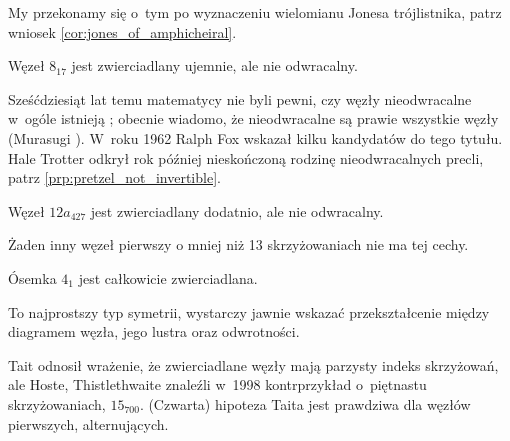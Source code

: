 My przekonamy się o~tym po wyznaczeniu wielomianu Jonesa trójlistnika, patrz wniosek \ref{cor:jones_of_amphicheiral}.

\begin{example}
    Węzeł $8_{17}$ jest zwierciadlany ujemnie, ale nie odwracalny.
\end{example}

Sześćdziesiąt lat temu matematycy nie byli pewni, czy węzły nieodwracalne w~ogóle istnieją \cite[problem 10]{fox1962};
obecnie wiadomo, że nieodwracalne są prawie wszystkie węzły (Murasugi \cite[s.~46]{murasugi1996}).
%
W~roku 1962 Ralph Fox wskazał kilku kandydatów do tego tytułu.
%
Hale Trotter odkrył rok później nieskończoną rodzinę nieodwracalnych precli, patrz \ref{prp:pretzel_not_invertible}.
%


\begin{example}
    Węzeł $12a_{427}$ jest zwierciadlany dodatnio, ale nie odwracalny.
\end{example}

Żaden inny węzeł pierwszy o mniej niż 13 skrzyżowaniach nie ma tej cechy.

\begin{example}
\label{property_of_eight_knot}%
    Ósemka $4_1$ jest całkowicie zwierciadlana.
\end{example}

To najprostszy typ symetrii, wystarczy jawnie wskazać przekształcenie między diagramem węzła, jego lustra oraz odwrotności.

Tait odnosił wrażenie, że zwierciadlane węzły mają parzysty indeks skrzyżowań, ale Hoste, Thistlethwaite znaleźli w~1998 kontrprzykład o~piętnastu skrzyżowaniach, $15_{700}$. %
(Czwarta) hipoteza Taita jest prawdziwa dla węzłów pierwszych, alternujących.


